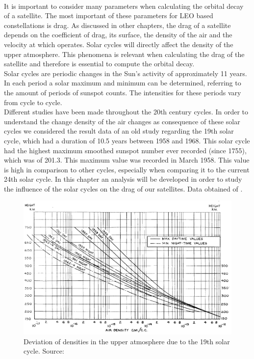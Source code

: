 \paragraph{ }

It is important to consider many parameters when calculating the orbital decay of a satellite. The most important of these parameters for LEO based constellations is drag. As discussed in other chapters, the drag of a satellite depends on the coefficient of drag, its surface, the density of the air and the velocity at which operates. Solar cycles will directly affect the density of the upper atmosphere. This phenomena is relevant when calculating the drag of the satellite and therefore is essential to compute the orbital decay. \\

Solar cycles are periodic changes in the Sun's activity of approximately 11 years. In each period a solar maximum and minimum can be determined, referring to the amount of periods of sunspot counts. The intensities for these periods vary from cycle to cycle. \\



Different studies have been made throughout the 20th century cycles. In order to understand the change  density of the air changes as consequence of these solar cycles we considered the result data of an old study regarding the 19th solar cycle, which had a duration of 10.5 years between 1958 and 1968. This solar cycle had the highest maximum smoothed sunspot number ever recorded (since 1755), which was of 201.3. This maximum value was recorded in March 1958. This value is high in comparison to other cycles, especially when comparing it to the current 24th solar cycle. In this chapter an analysis will be developed in order to study the influence of the solar cycles on the drag of our satellites.  Data obtained of \cite{Priester1967}.



\begin{figure}[h]
\includegraphics[width=14cm]{solarcycles}
\centering
\caption{Deviation of densities in the upper atmosphere due to the 19th solar cycle. Source: \cite{Priester1967}}
\end{figure}


